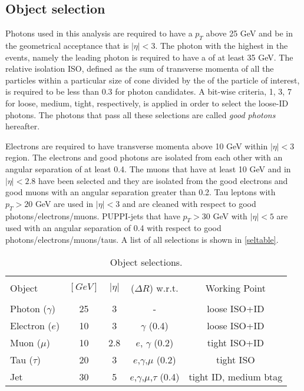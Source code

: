{\subsection{Object selection}

Photons used in this analysis are required to have a $p_T$ above 25 GeV and be in the geometrical acceptance that is $|\eta| < 3$. The photon with the highest \pt in the events, namely the leading photon is required to have a \pt of at least 35 GeV. The relative isolation ISO, defined as the sum of transverse momenta of all the particles within a particular size of cone divided by the \pt of the particle of interest, is required to be less than 0.3 for photon candidates. A bit-wise criteria, 1, 3, 7 for loose, medium, tight, respectively, is applied in order to select the loose-ID photons. The photons that pass all these selections are called \emph{good photons} hereafter.

Electrons are required to have transverse momenta above 10 GeV within $|\eta|<3$ region. The electrons and good photons are isolated from each other with an angular separation of at least 0.4. The muons that have at least 10 GeV \pt and in $|\eta|<2.8$ have been selected and they are isolated from the good electrons and good muons with an angular separation greater than 0.2. Tau leptons with $p_T > 20$ GeV are used in $|\eta|<3$ and are cleaned with respect to good photons/electrons/muons. PUPPI-jets that have $p_T > 30$ GeV with $|\eta|<5$ are used with an angular separation of 0.4 with respect to good photons/electrons/muons/taus. A list of all selections is shown in \autoref{seltable}.

\begin{table*}[ht]
	{\setlength{\tabcolsep}{14pt}
		\caption{Object selections.}
		\begin{center}
			\vspace{-6mm}
			\begin{tabular}{lcccc}
				\hline \\[-2.45ex] \hline \\[-2.1ex]
				Object & \pt $\left[GeV\right]$ & $|\eta|$ & ($\Delta R$) w.r.t. & Working Point \\
				\hline \\[-1.8ex]
                Photon ($\gamma$) & 25 & 3 & - & loose ISO+ID \\
                Electron ($e$) & 10 & 3 & $\gamma$ (0.4) & loose ISO+ID \\
                Muon ($\mu$) & 10 & 2.8 & $e$, $\gamma$ (0.2) & tight ISO+ID \\
                Tau ($\tau$) & 20 & 3 & $e$,$\gamma$,$\mu$ (0.2) & tight ISO \\
                Jet & 30 & 5 & $e$,$\gamma$,$\mu$,$\tau$ (0.4) & tight ID, medium btag \\
				\hline
			\end{tabular}
			\vspace{-6mm}
		\end{center}
		\label{seltable}}
\end{table*}

}
